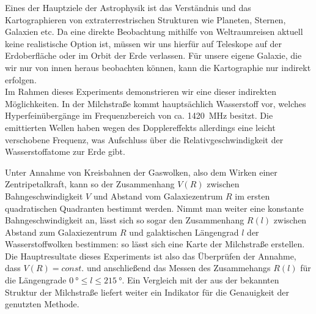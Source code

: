 \documentclass[../main.tex]{subfiles}
\begin{document}
Eines der Hauptziele der Astrophysik ist das Verständnis und das Kartographieren von extraterrestrischen Strukturen wie Planeten, Sternen, Galaxien etc. Da eine direkte Beobachtung mithilfe von Weltraumreisen aktuell keine realistische Option ist, müssen wir uns hierfür auf Teleskope auf der Erdoberfläche oder im Orbit der Erde verlassen. Für unsere eigene Galaxie, die wir nur von innen heraus beobachten können, kann die Kartographie nur indirekt erfolgen.\\

Im Rahmen dieses Experiments demonstrieren wir eine dieser indirekten Möglichkeiten. In der Milchstraße kommt hauptsächlich Wasserstoff vor, welches Hyperfeinübergänge im Frequenzbereich von ca. \SI{1420}{\mega\hertz} besitzt. Die emittierten Wellen haben wegen des Dopplereffekts allerdings eine leicht verschobene Frequenz, was Aufschluss über die Relativgeschwindigkeit der Wasserstoffatome zur Erde gibt.

Unter Annahme von Kreisbahnen der Gaswolken, also dem Wirken einer Zentripetalkraft, kann so der Zusammenhang $V(R)$ zwischen Bahngeschwindigkeit $V$ und Abstand vom Galaxiezentrum $R$ im ersten quadratischen Quadranten bestimmt werden. Nimmt man weiter eine konstante Bahngeschwindigkeit an, lässt sich so sogar den Zusammenhang $R(l)$ zwischen Abstand zum Galaxiezentrum $R$ und galaktischen Längengrad $l$ der Wasserstoffwolken bestimmen: so lässt sich eine Karte der Milchstraße erstellen.\\

\noindent Die Hauptresultate dieses Experiments ist also das Überprüfen der Annahme, dass $V(R)=const.$ und anschließend das Messen des Zusammehangs $R(l)$ für die Längengrade $\SI{0}{\degree}\le l\le \SI{215}{\degree}$. Ein Vergleich mit der aus der bekannten Struktur der Milchstraße liefert weiter ein Indikator für die Genauigkeit der genutzten Methode.
\end{document}
